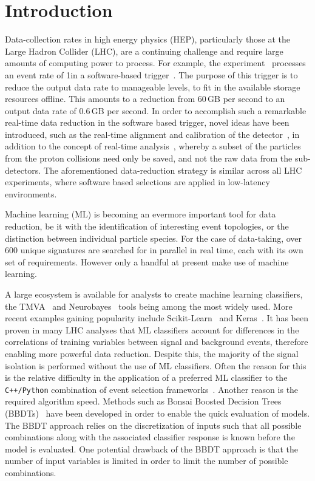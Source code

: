 \section{Introduction}
\label{sec:intro}

Data-collection rates in high energy physics (HEP), particularly those at the Large Hadron Collider (LHC),
are a continuing challenge and require large amounts of computing power to process.
For example, the \lhcb experiment~\cite{Alves:2008zz} processes an event rate of 1\mhz in a software-based
trigger~\cite{LHCb-DP-2014-002}. The purpose of this trigger is to reduce the output
data rate to manageable levels, \ie to fit in the available storage resources offline.
This amounts to a reduction from 60\,GB per second to an output data rate of 0.6\,GB per second.
In order to accomplish such a remarkable real-time data reduction in the software based trigger,
novel ideas have been introduced, such as the real-time alignment and calibration of the detector~\cite{Xu:2016mik},
in addition to the concept of real-time analysis~\cite{Aaij:2016rxn}, whereby a subset of the particles from the proton collisions need only
be saved, and not the raw data from the sub-detectors.
The aforementioned data-reduction strategy is similar across all LHC experiments, where
software based selections are applied in low-latency environments.

Machine learning (ML) is becoming an evermore important tool for data reduction,
be it with the identification of interesting event topologies, or the distinction
between individual particle species. For the case of \lhcb data-taking, over 600
unique signatures are searched for in parallel in real time, each with its own set of requirements.
However only a handful at present make use of machine learning.

A large ecosystem is available for analysts to create machine learning classifiers,
the TMVA~\cite{Hocker:2007ht} and Neurobayes~\cite{Feindt:2006pm} tools being among the most widely used.
More recent examples gaining popularity include Scikit-Learn~\cite{Pedregosa:2012toh}
and Keras~\cite{keras}. It has been proven in many LHC analyses that
ML classifiers account for differences in the correlations of
training variables between signal and background events, therefore enabling more
powerful data reduction.
Despite this, the majority of the signal isolation is performed
without the use of ML classifiers. Often the reason for this is the relative difficulty in
the application of a preferred ML classifier to the {\tt C++/Python} combination
of event selection frameworks~\cite{Barrand:2001ny}. Another
reason is the required algorithm speed. Methods such as Bonsai
Boosted Decision Trees (BBDTs)~\cite{Gligorov:2012qt} have been developed in order
to enable the quick evaluation of models. The BBDT approach relies on the
discretization of inputs such that all possible combinations along with
the associated classifier response is known before the model is evaluated.
One potential drawback of the BBDT approach is that the number of input variables is limited
in order to limit the number of possible combinations.

